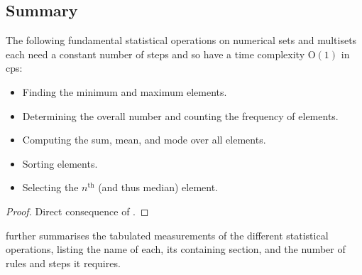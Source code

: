 \subsection{Summary}

\begin{theorem}
The following fundamental statistical operations on numerical sets and multisets each need a constant number of steps and so have a time complexity O\((1)\) in \gls{cps}:
\begin{itemize}
    \item Finding the minimum and maximum elements.
    \item Determining the overall number and counting the frequency of elements.
    \item Computing the sum, mean, and mode over all elements.
    \item Sorting elements.
    \item Selecting the \(n^{\text{th}}\) (and thus median) element.
\end{itemize}
\end{theorem}

\begin{proof}
Direct consequence of .
\end{proof}

 further summarises the tabulated measurements of the different statistical operations, listing the name of each, its containing section, and the number of rules and steps it requires.

